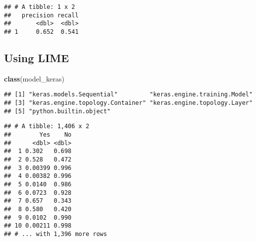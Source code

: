 \documentclass[]{article}
\newenvironment{Shaded}{\begin{snugshade}}{\end{snugshade}}
\newcommand{\KeywordTok}[1]{\textcolor[rgb]{0.13,0.29,0.53}{\textbf{#1}}}
\newcommand{\DataTypeTok}[1]{\textcolor[rgb]{0.13,0.29,0.53}{#1}}
\newcommand{\DecValTok}[1]{\textcolor[rgb]{0.00,0.00,0.81}{#1}}
\newcommand{\StringTok}[1]{\textcolor[rgb]{0.31,0.60,0.02}{#1}}
\newcommand{\CommentTok}[1]{\textcolor[rgb]{0.56,0.35,0.01}{\textit{#1}}}
\newcommand{\ControlFlowTok}[1]{\textcolor[rgb]{0.13,0.29,0.53}{\textbf{#1}}}
\newcommand{\OperatorTok}[1]{\textcolor[rgb]{0.81,0.36,0.00}{\textbf{#1}}}
\newcommand{\NormalTok}[1]{#1}
\begin{document}
\begin{verbatim}
## # A tibble: 1 x 2
##   precision recall
##       <dbl>  <dbl>
## 1     0.652  0.541
\end{verbatim}

\subsection{Using LIME}\label{using-lime}

\begin{Shaded}
\begin{Highlighting}[]
\KeywordTok{class}\NormalTok{(model_keras)}
\end{Highlighting}
\end{Shaded}

\begin{verbatim}
## [1] "keras.models.Sequential"         "keras.engine.training.Model"    
## [3] "keras.engine.topology.Container" "keras.engine.topology.Layer"    
## [5] "python.builtin.object"
\end{verbatim}

\begin{Shaded}
\end{Shaded}

\begin{verbatim}
## # A tibble: 1,406 x 2
##        Yes    No
##      <dbl> <dbl>
##  1 0.302   0.698
##  2 0.528   0.472
##  3 0.00399 0.996
##  4 0.00382 0.996
##  5 0.0140  0.986
##  6 0.0723  0.928
##  7 0.657   0.343
##  8 0.580   0.420
##  9 0.0102  0.990
## 10 0.00211 0.998
## # ... with 1,396 more rows
\end{verbatim}
\end{document}
